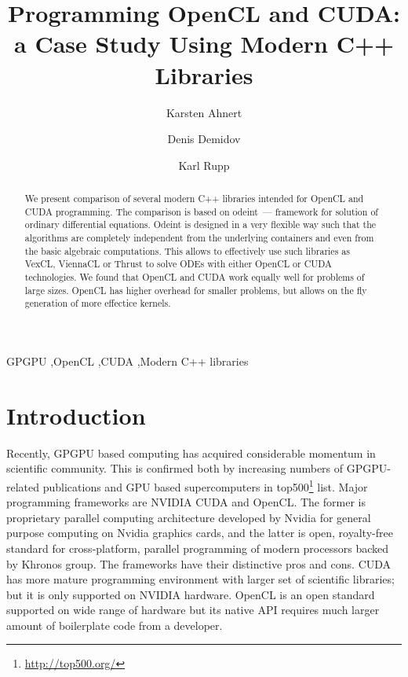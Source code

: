 \documentclass[1p]{elsarticle}
\begin{document}
\begin{frontmatter}

\title{Programming OpenCL and CUDA:\\a Case Study Using Modern C++ Libraries}

\author{Karsten Ahnert}
\address{
Institut f\"ur Physik und Astronomie, Universit\"at Potsdam,\\
Karl-Liebknecht-Strasse 24/25, 14476 Potsdam-Golm, Germany
}

\author{Denis Demidov}
\address{
Kazan Branch of Joint Supercomputer Center,
Russian Academy of Sciences,\\
Lobachevsky st. 2/31, 420008 Kazan, Russia
}

\author{Karl Rupp}
\address{
Institute for Microelectronics, TU Wien,\\
Gusshausstrasse 27-29/E360, A-1040 Wien, Austria
}

\begin{abstract}
    We present comparison of several modern C++ libraries intended for OpenCL
    and CUDA programming. The comparison is based on odeint~--- framework for
    solution of ordinary differential equations. Odeint is designed in a very
    flexible way such that the algorithms are completely independent from the
    underlying containers and even from the basic algebraic computations. This
    allows to effectively use such libraries as VexCL, ViennaCL or Thrust to
    solve ODEs with either OpenCL or CUDA technologies. We found that OpenCL
    and CUDA work equally well for problems of large sizes. OpenCL has higher
    overhead for smaller problems, but allows on the fly generation of more
    effectice kernels.
\end{abstract}

\begin{keyword}
    GPGPU \sep OpenCL \sep CUDA \sep Modern C++ libraries
\end{keyword}

\end{frontmatter}

\section{Introduction}

Recently, GPGPU based computing has acquired considerable momentum in
scientific community. This is confirmed both by increasing numbers of
GPGPU-related publications and GPU based supercomputers in
top500\footnote{\href{http://top500.org/}{http://top500.org/}} list. Major
programming frameworks are NVIDIA CUDA and OpenCL.  The former is proprietary
parallel computing architecture developed by Nvidia for general purpose
computing on Nvidia graphics cards, and the latter is open, royalty-free
standard for cross-platform, parallel programming of modern processors backed
by Khronos group. The frameworks have their distinctive pros and cons. CUDA has
more mature programming environment with larger set of scientific libraries;
but it is only supported on NVIDIA hardware. OpenCL is an open standard
supported on wide range of hardware but its native API requires much larger
amount of boilerplate code from a developer.
\end{document}

